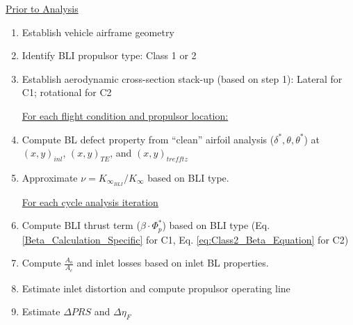				\vspace{5mm}
				\underline{Prior to Analysis}
				
				\begin{enumerate}[label = \protect\circled{\arabic*}]
					\item{Establish vehicle airframe geometry}
					\item{Identify BLI propulsor type:  Class 1 or 2}					
					\item{Establish aerodynamic cross-section stack-up (based on step 1):  Lateral for C1;  rotational for C2}
					
					\underline{For each flight condition and propulsor location:}
					
					\item{Compute BL defect property from ``clean'' airfoil analysis ($\delta^*, \theta, \theta^*$) at $(x,y)_{inl}$, $(x,y)_{TE}$, and $(x,y)_{trefftz}$}								
					\item{Approximate $\nu =K_{\infty_{BLI}}/K_\infty$ based on BLI type.}
					
					\underline{For each cycle analysis iteration}
					\item{Compute BLI thrust term ($\beta \cdot \Phi_p^*$) based on BLI type (Eq. \ref{Beta_Calculation_Specific} for C1, Eq. \ref{eq:Class2_Beta_Equation} for C2)} 	
					\item{Compute $\displaystyle\frac{A_o}{A_c}$  and inlet losses based on inlet BL properties.}
					\item{Estimate inlet distortion and compute propulsor operating line}								
					\item{Estimate $\Delta PRS$ and $\Delta \eta_F$}
				\end{enumerate}
				

